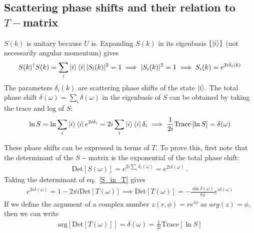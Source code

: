 \subsection{Scattering phase shifts and their relation to \(T-\)matrix}
\(S(k)\) is unitary because \(U\) is.
Expanding \(S(k)\) in its eigenbasis \(\left\{ \ket{i} \right\} \) (not necessarily angular momentum) gives
\begin{equation}\begin{aligned}
	S(k)^\dagger S(k) = \sum_i \ket{i}\bra{i} |S_l(k)|^2 = 1 \implies |S_i(k)|^2 = 1 \implies S_i(k) = e^{2 i \delta_i(k)}
\end{aligned}\end{equation}
The parameters \(\delta_i(k)\) are scattering phase shifts of the state \(\ket{i}\). The total phase shift \(\delta(\omega) = \sum_i \delta(\omega)\) in the eigenbasis of \(S\) can be obtained by taking the trace and log of \(S\):
\begin{equation}\begin{aligned}
	\ln S = \ln \sum_i \ket{i}\bra{i}e^{2i\delta_i} = 2i\sum_i \ket{i}\bra{i}\delta_i \implies \frac{1}{2i}\text{Trace} \left[\ln S\right] = \delta(\omega)
\end{aligned}\end{equation}

These phase shifts can be expressed in terms of \(T\).  To prove this, first note that the determinant of the \(S-\)matrix is the exponential of the total phase shift: 
\begin{equation}\begin{aligned}
	\text{Det} \left[S(\omega)\right] = e^{2i\sum_i\delta_i(\omega)}= e^{2i\delta(\omega)}~.
\end{aligned}\end{equation}
Taking the determinant of eq.~\ref{S_in_T} gives
\begin{equation}\begin{aligned}
	\label{tmatphase}
	e^{2i\delta(\omega)} = 1 - 2\pi i \text{Det}\left[T(\omega)\right] \implies \text{Det}\left[T(\omega)\right] = -\frac{\sin \delta(\omega)}{\pi \rho}e^{i\delta(\omega)}
\end{aligned}\end{equation}
If we define the argument of a complex number \(z(r,\phi) = r e^{i\phi}\) as \(arg(z) = \phi\), then we can write
\begin{equation}\begin{aligned}
	\label{phase_in_T}
	\text{arg}\left[\text{Det}\left[ T(\omega) \right]\right] = \delta(\omega) = \frac{1}{2i}\text{Trace} \left[\ln S\right]
\end{aligned}\end{equation}

